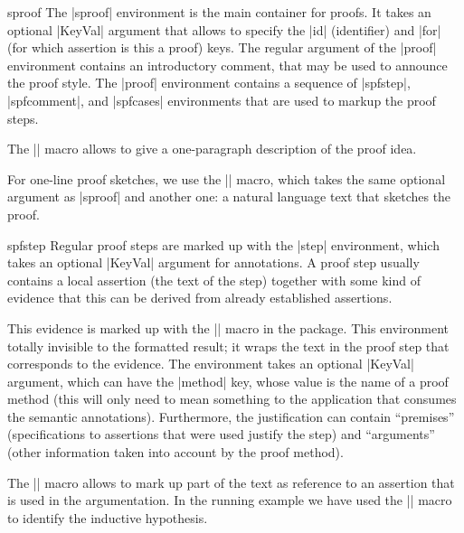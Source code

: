 \begin{environment}{sproof}
  The |sproof| environment is the main container for proofs. It takes an optional |KeyVal|
  argument that allows to specify the |id| (identifier) and |for| (for which assertion is
  this a proof) keys. The regular argument of the |proof| environment contains an
  introductory comment, that may be used to announce the proof style. The |proof|
  environment contains a sequence of |spfstep|, |spfcomment|, and |spfcases| environments
  that are used to markup the proof steps.
\end{environment}
  
\begin{function}{\spfidea}
  The |\spfidea| macro allows to give a one-paragraph description of the proof idea.
\end{function}

\begin{function}{\spfsketch}
  For one-line proof sketches, we use the |\spfsketch| macro, which takes the same
  optional argument as |sproof| and another one: a natural language text that sketches
  the proof.
\end{function}

\begin{environment}{spfstep}
  Regular proof steps are marked up with the |step| environment, which takes an optional
  |KeyVal| argument for annotations. A proof step usually contains a local assertion
  (the text of the step) together with some kind of evidence that this can be derived
  from already established assertions.
\end{environment}

\begin{function}{\spfjust}
  This evidence is marked up with the |\spfjust| macro in the 
  package. This environment totally invisible to the formatted result; it wraps the text
  in the proof step that corresponds to the evidence. The environment takes an optional
  |KeyVal| argument, which can have the |method| key, whose value is the name of a proof
  method (this will only need to mean something to the application that consumes the
  semantic annotations). Furthermore, the justification can contain ``premises''
  (specifications to assertions that were used justify the step) and ``arguments''
  (other information taken into account by the proof method).
\end{function}

\begin{function}{\premise}
  The |\premise| macro allows to mark up part of the text as reference to an assertion
  that is used in the argumentation. In the running example we have used the |\premise|
  macro to identify the inductive hypothesis.
\end{function}

